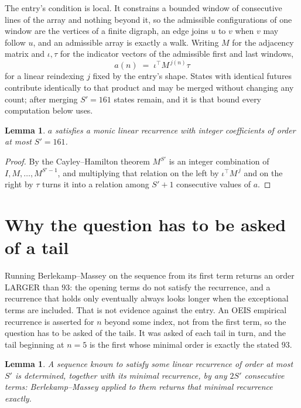 \documentclass[11pt,a4paper]{article}
\theoremstyle{plain}
\newtheorem{lemma}[theorem]{Lemma}
\theoremstyle{definition}
\begin{document}
The entry's condition is local. It constrains a bounded window of consecutive lines of the
array and nothing beyond it, so the admissible configurations of one window are the vertices of
a finite digraph, an edge joins $u$ to $v$ when $v$ may follow $u$, and an admissible array is
exactly a walk. Writing $M$ for the adjacency matrix and $\iota,\tau$ for the indicator vectors
of the admissible first and last windows,
\[
a(n)\;=\;\iota^{\!\top}M^{\,j(n)}\tau
\]
for a linear reindexing $j$ fixed by the entry's shape. States with identical futures
contribute identically to that product and may be merged without changing any count; after
merging $S'=161$ states remain, and it is that bound every computation below uses.

\begin{lemma}\label{lem:cf}
$a$ satisfies a monic linear recurrence with integer coefficients of order at most $S'=161$.
\end{lemma}

\begin{proof}
By the Cayley--Hamilton theorem $M^{S'}$ is an integer combination of $I,M,\dots,M^{S'-1}$,
and multiplying that relation on the left by $\iota^{\!\top}M^{\,j}$ and on the right by
$\tau$ turns it into a relation among $S'+1$ consecutive values of $a$.
\end{proof}

\section{Why the question has to be asked of a tail}

Running Berlekamp--Massey on the sequence from its first term returns an order LARGER than $93$: the opening terms do not satisfy the recurrence, and a recurrence that holds only eventually always looks longer when the exceptional terms are included. That is not evidence against the entry. An OEIS empirical recurrence is asserted for $n$ beyond some index, not from the first term, so the question has to be asked of the tails. It was asked of each tail in turn, and the tail beginning at $n=5$ is the first whose minimal order is exactly the stated $93$.

\begin{lemma}\label{lem:bm}
A sequence known to satisfy some linear recurrence of order at most $S'$ is determined,
together with its minimal recurrence, by any $2S'$ consecutive terms: Berlekamp--Massey applied
to them returns that minimal recurrence exactly.
\end{lemma}
\end{document}
